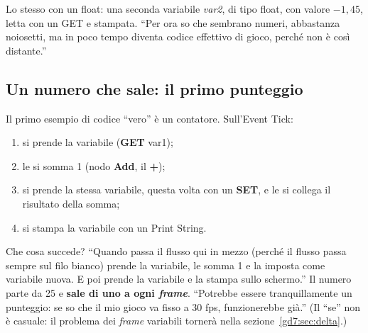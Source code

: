 Lo stesso con un float: una seconda variabile \emph{var2}, di tipo float, con
valore $-1{,}45$, letta con un GET e stampata. ``Per ora so che sembrano
numeri, abbastanza noiosetti, ma in poco tempo diventa codice effettivo di
gioco, perché non è così distante.''

\subsection{Un numero che sale: il primo punteggio}

Il primo esempio di codice ``vero'' è un contatore. Sull'Event Tick:
\begin{enumerate}
  \item si prende la variabile (\textbf{GET} var1);
  \item le si somma 1 (nodo \textbf{Add}, il \textbf{+});
  \item si prende la stessa variabile, questa volta con un \textbf{SET}, e
        le si collega il risultato della somma;
  \item si stampa la variabile con un Print String.
\end{enumerate}
Che cosa succede? ``Quando passa il flusso qui in mezzo (perché il flusso
passa sempre sul filo bianco) prende la variabile, le somma 1 e la imposta
come variabile nuova. E poi prende la variabile e la stampa sullo schermo.''
Il numero parte da 25 e \textbf{sale di uno a ogni \emph{frame}}. ``Potrebbe
essere tranquillamente un punteggio: se so che il mio gioco va fisso a 30 fps,
funzionerebbe già.'' (Il ``se'' non è casuale: il problema dei \emph{frame}
variabili tornerà nella sezione~\ref{gd7:sec:delta}.)

